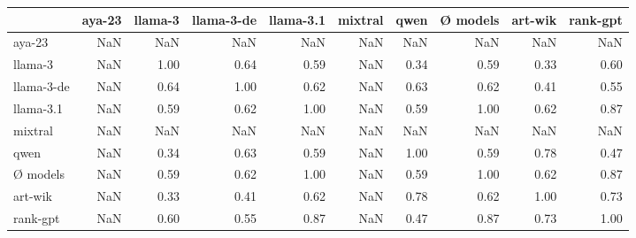 \begin{tabular}{lrrrrrrrrr}
\toprule
 & aya-23 & llama-3 & llama-3-de & llama-3.1 & mixtral & qwen & Ø models & art-wik & rank-gpt \\
\midrule
aya-23 & NaN & NaN & NaN & NaN & NaN & NaN & NaN & NaN & NaN \\
llama-3 & NaN & 1.00 & 0.64 & 0.59 & NaN & 0.34 & 0.59 & 0.33 & 0.60 \\
llama-3-de & NaN & 0.64 & 1.00 & 0.62 & NaN & 0.63 & 0.62 & 0.41 & 0.55 \\
llama-3.1 & NaN & 0.59 & 0.62 & 1.00 & NaN & 0.59 & 1.00 & 0.62 & 0.87 \\
mixtral & NaN & NaN & NaN & NaN & NaN & NaN & NaN & NaN & NaN \\
qwen & NaN & 0.34 & 0.63 & 0.59 & NaN & 1.00 & 0.59 & 0.78 & 0.47 \\
Ø models & NaN & 0.59 & 0.62 & 1.00 & NaN & 0.59 & 1.00 & 0.62 & 0.87 \\
art-wik & NaN & 0.33 & 0.41 & 0.62 & NaN & 0.78 & 0.62 & 1.00 & 0.73 \\
rank-gpt & NaN & 0.60 & 0.55 & 0.87 & NaN & 0.47 & 0.87 & 0.73 & 1.00 \\
\bottomrule
\end{tabular}
